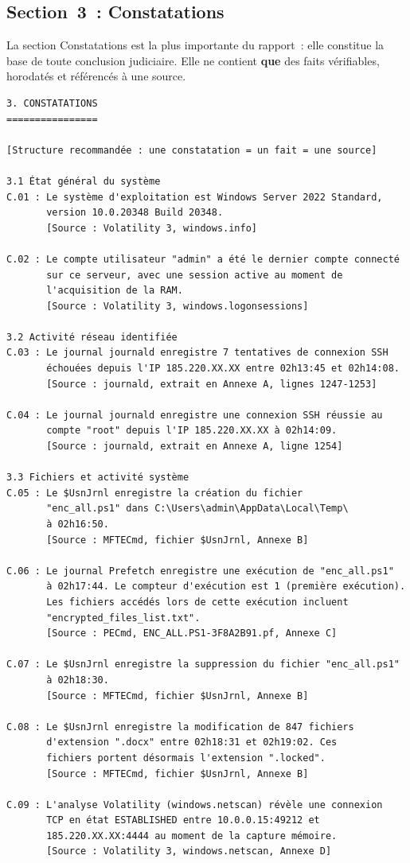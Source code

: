 \subsection{Section~3~: Constatations}

La section Constatations est la plus importante du rapport~: elle
constitue la base de toute conclusion judiciaire. Elle ne contient
\textbf{que} des faits vérifiables, horodatés et référencés à une source.

\begin{lstlisting}[language=bash_forensique,
    caption={Section Constatations -- structure et exemple MVOM}]
3. CONSTATATIONS
================

[Structure recommandée : une constatation = un fait = une source]

3.1 État général du système
C.01 : Le système d'exploitation est Windows Server 2022 Standard,
       version 10.0.20348 Build 20348.
       [Source : Volatility 3, windows.info]

C.02 : Le compte utilisateur "admin" a été le dernier compte connecté
       sur ce serveur, avec une session active au moment de
       l'acquisition de la RAM.
       [Source : Volatility 3, windows.logonsessions]

3.2 Activité réseau identifiée
C.03 : Le journal journald enregistre 7 tentatives de connexion SSH
       échouées depuis l'IP 185.220.XX.XX entre 02h13:45 et 02h14:08.
       [Source : journald, extrait en Annexe A, lignes 1247-1253]

C.04 : Le journal journald enregistre une connexion SSH réussie au
       compte "root" depuis l'IP 185.220.XX.XX à 02h14:09.
       [Source : journald, extrait en Annexe A, ligne 1254]

3.3 Fichiers et activité système
C.05 : Le $UsnJrnl enregistre la création du fichier
       "enc_all.ps1" dans C:\Users\admin\AppData\Local\Temp\
       à 02h16:50.
       [Source : MFTECmd, fichier $UsnJrnl, Annexe B]

C.06 : Le journal Prefetch enregistre une exécution de "enc_all.ps1"
       à 02h17:44. Le compteur d'exécution est 1 (première exécution).
       Les fichiers accédés lors de cette exécution incluent
       "encrypted_files_list.txt".
       [Source : PECmd, ENC_ALL.PS1-3F8A2B91.pf, Annexe C]

C.07 : Le $UsnJrnl enregistre la suppression du fichier "enc_all.ps1"
       à 02h18:30.
       [Source : MFTECmd, fichier $UsnJrnl, Annexe B]

C.08 : Le $UsnJrnl enregistre la modification de 847 fichiers
       d'extension ".docx" entre 02h18:31 et 02h19:02. Ces
       fichiers portent désormais l'extension ".locked".
       [Source : MFTECmd, fichier $UsnJrnl, Annexe B]

C.09 : L'analyse Volatility (windows.netscan) révèle une connexion
       TCP en état ESTABLISHED entre 10.0.0.15:49212 et
       185.220.XX.XX:4444 au moment de la capture mémoire.
       [Source : Volatility 3, windows.netscan, Annexe D]
\end{lstlisting}

